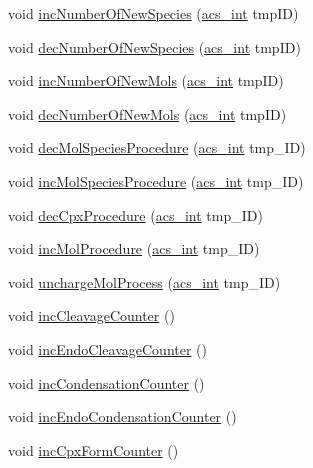 \begin{DoxyCompactItemize}
void \hyperlink{a00014_a1055886a34a9a01ec37db31c69e460e0}{inc\-Number\-Of\-New\-Species} (\hyperlink{a00050_a8d277355641a098190360234e2ebde35}{acs\-\_\-int} tmp\-I\-D)
\item 
void \hyperlink{a00014_a5fa52a4f8e73a71fa41d3a1641e50535}{dec\-Number\-Of\-New\-Species} (\hyperlink{a00050_a8d277355641a098190360234e2ebde35}{acs\-\_\-int} tmp\-I\-D)
\item 
void \hyperlink{a00014_a1addb84f0c8d391f97ad2347a64208bb}{inc\-Number\-Of\-New\-Mols} (\hyperlink{a00050_a8d277355641a098190360234e2ebde35}{acs\-\_\-int} tmp\-I\-D)
\item 
void \hyperlink{a00014_ae9bbd78076706050ced4dd7fb99036f1}{dec\-Number\-Of\-New\-Mols} (\hyperlink{a00050_a8d277355641a098190360234e2ebde35}{acs\-\_\-int} tmp\-I\-D)
\item 
void \hyperlink{a00014_a10fad450cf5ef3a1c7cf75d616105069}{dec\-Mol\-Species\-Procedure} (\hyperlink{a00050_a8d277355641a098190360234e2ebde35}{acs\-\_\-int} tmp\-\_\-\-I\-D)
\item 
void \hyperlink{a00014_a7e0e11e36d7bcd6ef438c426aa8754a0}{inc\-Mol\-Species\-Procedure} (\hyperlink{a00050_a8d277355641a098190360234e2ebde35}{acs\-\_\-int} tmp\-\_\-\-I\-D)
\item 
void \hyperlink{a00014_a16d09f818d3012f88e8e4c9a7759b6bd}{dec\-Cpx\-Procedure} (\hyperlink{a00050_a8d277355641a098190360234e2ebde35}{acs\-\_\-int} tmp\-\_\-\-I\-D)
\item 
void \hyperlink{a00014_a094499a0f1bb3c2342a3b16944f5280d}{inc\-Mol\-Procedure} (\hyperlink{a00050_a8d277355641a098190360234e2ebde35}{acs\-\_\-int} tmp\-\_\-\-I\-D)
\item 
void \hyperlink{a00014_af21c066ce18c8a39740f66a995782fb9}{uncharge\-Mol\-Process} (\hyperlink{a00050_a8d277355641a098190360234e2ebde35}{acs\-\_\-int} tmp\-\_\-\-I\-D)
\item 
void \hyperlink{a00014_a480887ed06f63d34e014c19ea302d3d5}{inc\-Cleavage\-Counter} ()
\item 
void \hyperlink{a00014_ab0fc2cd6ed209d61286b837bd5460d90}{inc\-Endo\-Cleavage\-Counter} ()
\item 
void \hyperlink{a00014_a3fae8e57fad9ef5b182e32d9bb9989af}{inc\-Condensation\-Counter} ()
\item 
void \hyperlink{a00014_a01812d540519696ab07c9f822119cc64}{inc\-Endo\-Condensation\-Counter} ()
\item 
void \hyperlink{a00014_afd3d590aa9b6a644cb360cc5fd47e16a}{inc\-Cpx\-Form\-Counter} ()
\item 

\end{DoxyCompactItemize}
